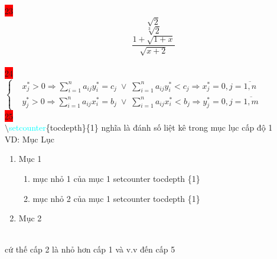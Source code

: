 \documentclass{article}
\begin{document}
\colorbox{red}{23}\\
$$\sqrt{2}$$ %
$$\sqrt[3]{2}$$ %
$$\dfrac{1+\sqrt{1+x}}{\sqrt{x+2}}$$\\

\colorbox{red}{24}\\

$\left\{\begin{aligned}
    & x_j^* > 0 \Longrightarrow \displaystyle\sum\limits_{i=1}^na_{ij}y_i^*=c_j \;\vee\;\displaystyle\sum\limits_{i=1}^na_{ij}y_i^* < c_j\Longrightarrow x_j^* =0,j=\overline{1,n}\\
    & y_j^* > 0 \Longrightarrow \displaystyle\sum\limits_{i=1}^na_{ij}x_i^*=b_j \;\vee\;\displaystyle\sum\limits_{i=1}^na_{ij}x_i^* < b_j\Longrightarrow y_j^* =0,j=\overline{1,m}
    

\end{aligned}\right.$\\

\colorbox{red}{25}\\

$\setminus$\textcolor{cyan}{setcounter}\{tocdepth\}\{1\} nghĩa là đánh số liệt kê trong mục lục cấp độ 1\\
VD: Mục Lục\\
\begin{enumerate}
    \item Mục 1
    \begin{enumerate}[1.]
    \item mục nhỏ 1  của mục 1 setcounter tocdepth \{1\}
    \item mục nhỏ 2  của mục 1 setcounter tocdepth \{1\}
    \end{enumerate}
    \item Mục 2
\end{enumerate}\\
cứ thế cấp 2 là nhỏ hơn cấp 1 và v.v đến cấp 5
\end{document}
